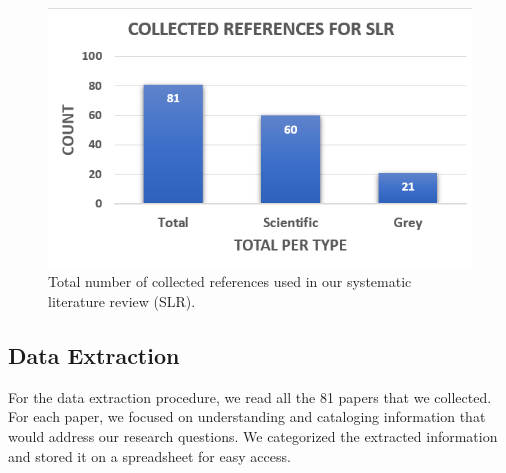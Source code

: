 \begin{figure}[h]
	\centering
	\includegraphics[width=\linewidth]{images/stats_total}	
	\caption{Total number of collected references used in our systematic literature review (SLR).}
	\label{fig:stats-total}
\end{figure}		



\subsection{Data Extraction}


For the data extraction procedure, we read all the 81 papers that we collected. For each paper, we focused on understanding and cataloging information that would address our research questions. We categorized the extracted information and stored it on a spreadsheet for easy access. 

